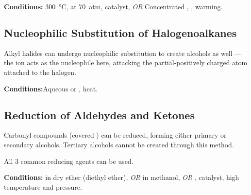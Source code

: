			\vspace{1.5em}
			\vbox{\textbf{Conditions:}	\tabto{35mm}\SI{300}{\celsius}, at \SI{70}{atm},  catalyst, \textit{OR}
										\tabto{35mm}Concentrated , , warming.}




		\pagebreak
		\subsection{Nucleophilic Substitution of Halogenoalkanes}

			Alkyl halides can undergo nucleophilic substitution to create alcohols as well –– the  ion acts as the
			nucleophile here, attacking the partial-positively charged  atom attached to the halogen.

			\vspace{1.5em}
			\vbox{\textbf{Conditions:}\tabto{35mm}Aqueous  or , heat.}

			\diagram[1.0]{
				\schemestart[0,1.5,thick]
					\chemfig{!\molR-[:0]!\molX}
					\hspace{2mm} + \hspace{2mm}
					\chemfig{!\molOH\mch}
					\arrow
					\chemfig{!\molR-[:0]!\molOH}
					\hspace{2mm} + \hspace{2mm}
					\chemfig{!\molX\mch}
				\schemestop
			}


		\subsection{Reduction of Aldehydes and Ketones}

			Carbonyl compounds (covered \hyperlink{ChapterAldehydesAndKetones}{}) can be reduced, forming either primary or secondary
			alcohols. Tertiary alcohols cannot be created through this method.

			All 3 common reducing agents can be used.

			\vspace{1.5em}
			\vbox{\textbf{Conditions:}	\tabto{35mm} in dry ether (diethyl ether), \textit{OR}
  										\tabto{35mm} in methanol, \textit{OR}
  										\tabto{35mm},  catalyst, high temperature and pressure.}

